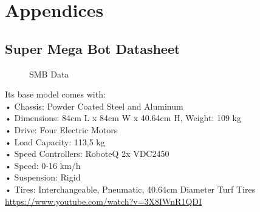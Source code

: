 \chapter*{Appendices}
\clearpage
{}
\section{Super Mega Bot Datasheet}
\label{AppA}

\begin{figure}[h]
	\begin{center} 
		\qquad
		\caption{SMB Data}
	\end{center}
\end{figure}

Its base model comes with:\\
•	Chassis: Powder Coated Steel and Aluminum \\
•	Dimensions: 84cm L x 84cm W x 40.64cm H, Weight: 109 kg\\
•	Drive: Four Electric Motors\\
•	Load Capacity: 113,5 kg\\
•	Speed Controllers: RoboteQ 2x VDC2450\\
•	Speed: 0-16 km/h \\
•	Suspension: Rigid\\
•	Tires: Interchangeable, Pneumatic, 40.64cm Diameter Turf Tires\\
\url{https://www.youtube.com/watch?v=3X8IWnR1QDI}





\label{AppB}


